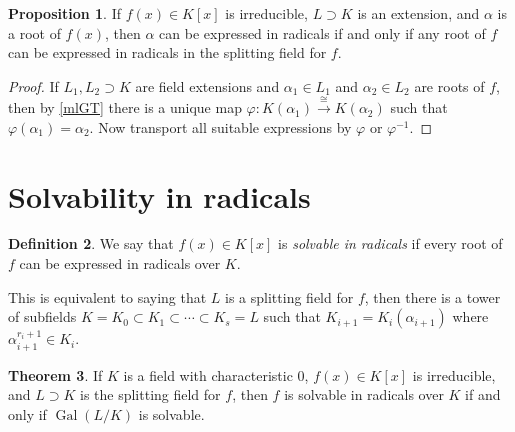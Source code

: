 \documentclass[10pt,letterpaper,cm]{nupset}
\theoremstyle{definition}
\newtheorem{definition}{Definition}[subsection]
\theoremstyle{theorem}
\newtheorem{theorem}[definition]{Theorem}
\newtheorem{prop}[definition]{Proposition}
\theoremstyle{remark}
\newcommand{\1}{\mathbf{1}}
\newcommand{\0}{\vec 0}
\DeclareMathOperator{\gal}{Gal}
\begin{document}
\begin{prop}
If $f(x) \in K[x]$ is irreducible, $L \supset K$ is an extension, and $\alpha$ is a root of $f(x)$, then $\alpha$ can be expressed in radicals if and only if any root of $f$ can be expressed in radicals in the splitting field for $f$.
\end{prop}
\begin{proof}
If $L_1, L_2 \supset K$ are field extensions and $\alpha_1 \in L_1$ and $\alpha_2 \in L_2$ are roots of $f$, then by \cref{mlGT} there is a unique map $\varphi : K(\alpha_1) \overset{\cong}{\longrightarrow} K(\alpha_2)$ such that $\varphi(\alpha_1) = \alpha_2$. Now transport all suitable expressions by $\varphi$ or $\varphi^{-1}$.
\end{proof}

\section{Solvability in radicals}

\begin{definition}
We say that $f(x) \in K[x]$ is \textit{solvable in radicals} if every root of $f$ can be expressed in radicals over $K$.
\end{definition}


This is equivalent to saying that $L$ is a splitting field for $f$, then there is a tower of subfields $K=K_0 \subset K_1 \subset \cdots \subset K_s =L$ such that $K_{i+1} = K_i(\alpha_{i+1})$ where $\alpha_{i+1}^{r_i+1} \in K_i$.


\begin{theorem}
If $K$ is a field with characteristic $0$, $f(x) \in K[x]$ is irreducible, and $L \supset K$ is the splitting field for $f$, then  $f$ is solvable in radicals over $K$ if and only if $\gal(L/K)$ is solvable. 
\end{theorem}
\end{document}
